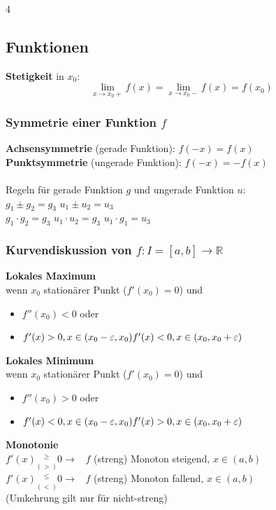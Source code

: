 \documentclass[6pt,a4paper]{scrartcl}
\begin{document}
\begin{multicols*}{4}
	\subsection{Funktionen}
	\textbf{Stetigkeit} in $x_0$:
	\begin{equation*}
		\lim_{x\to x_0+}f(x)=\lim_{x\to x_0-}f(x)=f(x_0)
	\end{equation*}

	\subsubsection{Symmetrie einer Funktion $f$}
	\textbf{Achsensymmetrie} (gerade Funktion): $f(-x)=f(x)$\\
	\textbf{Punktsymmetrie} (ungerade Funktion): $f(-x)=-f(x)$\\
	\\
	Regeln für gerade Funktion $g$ und ungerade Funktion $u$:\\
	$g_1 \pm g_2 = g_3$ \qquad $u_1 \pm u_2 = u_3$\\
	$g_1 \cdot g_2=g_3$ \qquad $u_1 \cdot u_2 = g_3$ \qquad $u_1 \cdot g_1=u_3$

	\subsubsection{Kurvendiskussion von $f: I = [a, b] \rightarrow \mathbb{R}$}
	\textbf{Lokales Maximum} \\
	wenn $x_0$ stationärer Punkt ($f'(x_0) = 0$) und
	\begin{itemize}\itemsep0pt
		\item
		      $f''(x_0)<0$ oder
		\item
		      $f'(x) > 0, x \in (x_0-\varepsilon, x_0) \\
			      f'(x) < 0, x \in (x_0, x_0+\varepsilon)$
	\end{itemize}
	\textbf{Lokales Minimum} \\
	wenn $x_0$ stationärer Punkt ($f'(x_0) = 0$) und
	\begin{itemize}\itemsep0pt
		\item
		      $f''(x_0)>0$ oder
		\item
		      $f'(x) < 0, x \in (x_0-\varepsilon, x_0) \\
			      f'(x) > 0, x \in (x_0, x_0+\varepsilon)$
	\end{itemize}

	\textbf{Monotonie} \\
	$f'(x) \underset{(>)}{^{\ge}} 0 \rightarrow$ \ $f$ (streng) Monoton steigend, $x\in(a,b)$\\
	$f'(x) \underset{(<)}{^{\le}} 0 \rightarrow$ \ $f$ (streng) Monoton fallend, $x\in(a,b)$\\
	(Umkehrung gilt nur für nicht-streng)\\


\end{multicols*}
\end{document}
